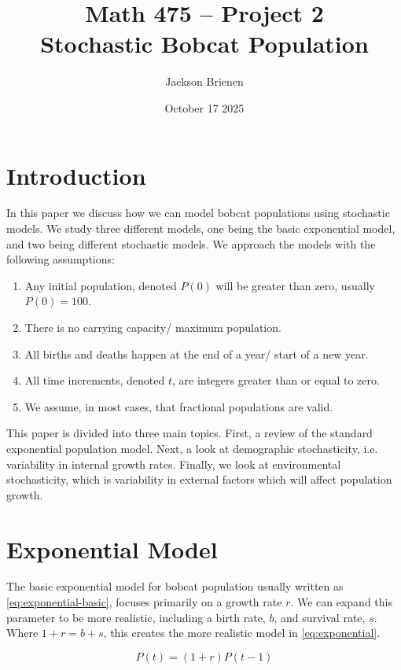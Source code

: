 \documentclass{article}
\title{Math 475 -- Project 2 \\ Stochastic Bobcat Population}
\author{Jackson Brienen}
\date{October 17 2025}
\begin{document}
\maketitle

\section{Introduction}

In this paper we discuss how we can model bobcat populations using stochastic models. We study three different models, one being the basic exponential model, and two being different stochastic models. We approach the models with the following assumptions:

\begin{enumerate}
    \item Any initial population, denoted $P(0)$ will be greater than zero, usually $P(0)=100$.
    \item There is no carrying capacity/ maximum population.
    \item All births and deaths happen at the end of a year/ start of a new year.
    \item All time increments, denoted $t$, are integers greater than or equal to zero.
    \item We assume, in most cases, that fractional populations are valid.
\end{enumerate}

This paper is divided into three main topics. First, a review of the standard exponential population model. Next, a look at demographic stochasticity, i.e. variability in internal growth rates. Finally, we look at environmental stochasticity, which is variability in external factors which will affect population growth.

\section{Exponential Model}

The basic exponential model for bobcat population usually written as \cref{eq:exponential-basic}, focuses primarily on a growth rate $r$. We can expand this parameter to be more realistic, including a birth rate, $b$, and survival rate, $s$. Where $1 + r = b + s$, this creates the more realistic model in \cref{eq:exponential}.

\begin{equation} \label{eq:exponential-basic}
    P(t) = (1 + r)P(t-1)
\end{equation}
\end{document}
